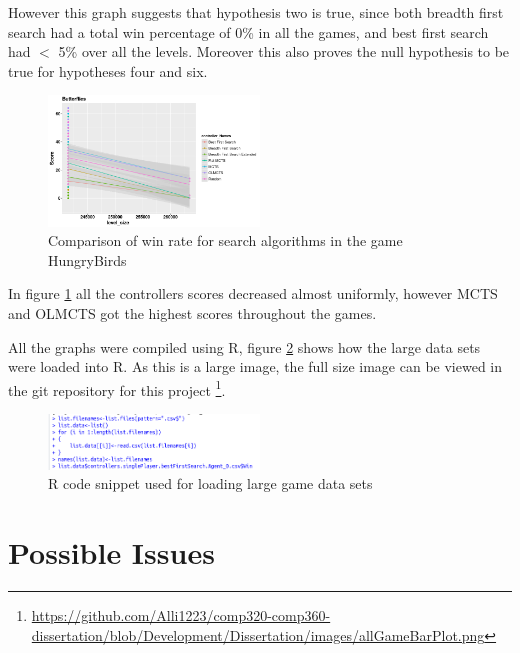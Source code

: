 \documentclass[journal]{IEEEtran}
\begin{document}
		However this graph suggests that hypothesis two is true, since both breadth first search had a total win percentage of 0\% in all the games, and best first search had $<$ 5\% over all the levels.
		Moreover this also proves the null hypothesis to be true for hypotheses four and six.

		\begin{figure}[h]
		    \centering
		    \includegraphics[width=0.5\textwidth]{Scatter/game_11_score_confidence}
		    \caption{ Comparison of win rate for search algorithms in the game HungryBirds }
		    \label{fig:game_11_score_confidence}
		\end{figure}
		In figure \ref{fig:game_11_score_confidence} all the controllers scores decreased almost uniformly, however MCTS and OLMCTS got the highest scores throughout the games.
		





	All the graphs were compiled using R, figure \ref{fig:croppedR1} shows how the large data sets were loaded into R. As this is a large image, the full size image can be viewed in the git repository for this project \footnote{\url{https://github.com/Alli1223/comp320-comp360-dissertation/blob/Development/Dissertation/images/allGameBarPlot.png}}.

	\begin{figure}[h]
		    \centering
		    \includegraphics[width=0.5\textwidth]{croppedR1}
		    \caption{ R code snippet used for loading large game data sets }
		    \label{fig:croppedR1}
		\end{figure}





\section{Possible Issues}\label{issues}
\end{document}
